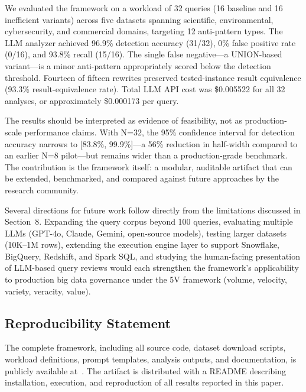 \documentclass[conference]{IEEEtran}
\begin{document}
We evaluated the framework on a workload of 32 queries (16 baseline and 16 inefficient variants) across five datasets spanning scientific, environmental, cybersecurity, and commercial domains, targeting 12 anti-pattern types. The LLM analyzer achieved 96.9\% detection accuracy (31/32), 0\% false positive rate (0/16), and 93.8\% recall (15/16). The single false negative---a UNION-based variant---is a minor anti-pattern appropriately scored below the detection threshold. Fourteen of fifteen rewrites preserved tested-instance result equivalence (93.3\% result-equivalence rate). Total LLM API cost was \$0.005522 for all 32 analyses, or approximately \$0.000173 per query.

The results should be interpreted as evidence of feasibility, not as production-scale performance claims. With N=32, the 95\% confidence interval for detection accuracy narrows to [83.8\%, 99.9\%]---a 56\% reduction in half-width compared to an earlier N=8 pilot---but remains wider than a production-grade benchmark. The contribution is the framework itself: a modular, auditable artifact that can be extended, benchmarked, and compared against future approaches by the research community.

Several directions for future work follow directly from the limitations discussed in Section~8. Expanding the query corpus beyond 100 queries, evaluating multiple LLMs (GPT-4o, Claude, Gemini, open-source models), testing larger datasets (10K--1M rows), extending the execution engine layer to support Snowflake, BigQuery, Redshift, and Spark SQL, and studying the human-facing presentation of LLM-based query reviews would each strengthen the framework's applicability to production big data governance under the 5V framework (volume, velocity, variety, veracity, value).

\subsection*{Reproducibility Statement}
The complete framework, including all source code, dataset download scripts, workload definitions, prompt templates, analysis outputs, and documentation, is publicly available at~\cite{sharma2026framework}. The artifact is distributed with a README describing installation, execution, and reproduction of all results reported in this paper.



\end{document}
